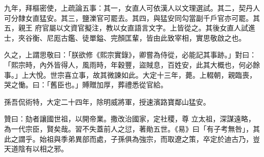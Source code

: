 \begin{pinyinscope}
 九年，拜樞密使，上疏論五事：其一，女直人可依漢人以文理選試。其二，契丹人可分隸女直猛安。其三，鹽濼官可罷去。其四，與猛安同勾當副千戶官亦可罷。其五，親王
 府官屬以文資官擬注，教以女直語言文字。上皆從之。其後女直人試進士，夾谷衡、尼厖古鑑、徒單鎰、完顏匡輩，皆由此致宰相，實思敬啟之也。



 久之，上謂思敬曰：「朕欲修《熙宗實錄》，卿嘗為侍從，必能記其事跡。」對曰：「熙宗時，內外皆得人，風雨時，年穀豐，盜賊息，百姓安，此其大概也，何必餘事。」上大悅。世宗喜立事，故其微諫如此。大定十三年，薨。上輟朝，親臨喪，哭之慟。曰：「舊臣也。」賻贈加厚，葬禮悉從官給。



 孫吾侃術特，大定二十四年，除明威將軍，授速濱路寶鄰山猛安。



 贊曰：劾者讓國世祖，以開帝業。撒改治國家，定社稷，尊
 立太祖，深謀遠略，為一代宗臣，賢矣哉。習不失蓋前人之愆，著勛五世。《易》曰「有子考無咎」，其此之謂乎。始祖與季弟異部而處，子孫俱為強宗，而取遼之策，卒定於迪古乃，豈天道陰有以相之邪。



\end{pinyinscope}